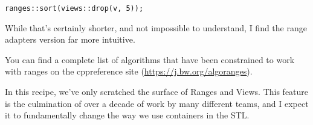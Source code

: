 \begin{lstlisting}[style=styleCXX]
	ranges::sort(views::drop(v, 5));
\end{lstlisting}

While that's certainly shorter, and not impossible to understand, I find the range adapters version far more intuitive.

You can find a complete list of algorithms that have been constrained to work with ranges on the cppreference site (\url{https://j.bw.org/algoranges}).

In this recipe, we've only scratched the surface of Ranges and Views. This feature is the culmination of over a decade of work by many different teams, and I expect it to fundamentally change the way we use containers in the STL.
























